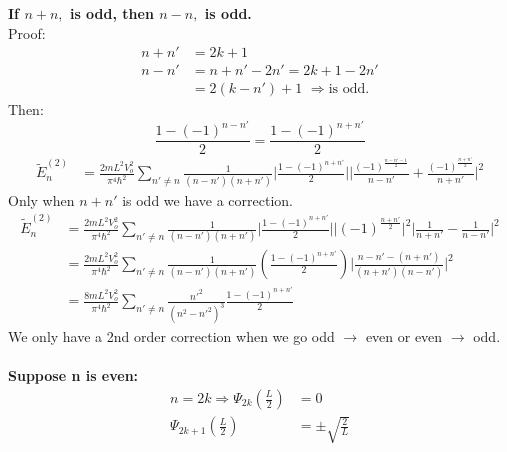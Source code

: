 \documentclass[12pt]{article}
\begin{document}
\textbf{If $n+n,$ is odd, then $n-n,$ is odd.}\\
Proof:
\begin{align*}
	n+n' & = 2k + 1\\
	n-n' & = n+n'-2n' = 2k+1-2n'\\
	& = 2(k - n') + 1\,\,\Longrightarrow \text{is odd.}
\end{align*}
Then:
\begin{equation*}
	\frac{1-(-1)^{n-n'}}{2} = \frac{1-(-1)^{n+n'}}{2}
\end{equation*}
\begin{align*}
	\tilde{E}^{(2)}_n & = \frac{2mL^2V_o^2}{\pi^4 \hbar^2}\sum_{n'\neq n}\frac{1}{(n-n')(n+n')}\bigg|
	\frac{1-(-1)^{n+n'}}{2} \bigg|\bigg|\frac{(-1)^{\frac{n-n'-1}{2}}}{n-n'} + \frac{(-1)^{\frac{n+n'}
{2}}}{n+n'} \bigg|^2
\end{align*}
Only when $n+n'$ is odd we have a correction.
\begin{align*}
	\tilde{E}^{(2)}_n & = \frac{2mL^2V_o^2}{\pi^4 \hbar^2}\sum_{n'\neq n}\frac{1}{(n-n')(n+n')}\bigg|
	\frac{1-(-1)^{n+n'}}{2} \bigg|\bigg|(-1)^{\frac{n+n'}{2}}\bigg|^2\bigg|\frac{1}{n+n'} - 
	\frac{1}{n-n'}\bigg|^2\\
	& =\frac{2mL^2V_o^2}{\pi^4 \hbar^2}\sum_{n'\neq n}\frac{1}{(n-n')(n+n')}\left(
	\frac{1-(-1)^{n+n'}}{2}\right) \Bigg|\frac{n-n'-(n+n')}{(n+n')(n-n')}\Bigg|^2\\
	& = \frac{8mL^2V_o^2}{\pi^4 \hbar^2}\sum_{n'\neq n} \frac{n'^2}{(n^2 - n'^2)^3}\frac{1-(-1)^{n+n'}
	}{2}
\end{align*}
We only have a 2nd order correction when we go odd $\rightarrow$ even or even $\rightarrow$ odd.\\
\\
\textbf{Suppose n is even:}\\
\begin{align*}
	n = 2k \Longrightarrow \Psi_{2k}\left(\frac{L}{2}\right) & = 0\\
	\Psi_{2k + 1} \left(\frac{L}{2}\right) & = \pm \sqrt{\frac{2}{L}}
\end{align*}
\end{document}
